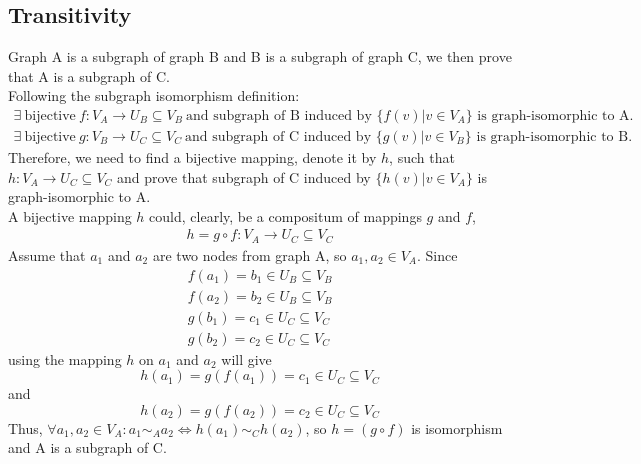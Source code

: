 \documentclass[a4paper,11pt]{article}
\begin{document}

\subsection{Transitivity}
Graph A is a subgraph of graph B and B is a subgraph of graph C, we then prove that A is a subgraph of C.
\\
Following the subgraph isomorphism definition:
\begin{align*}
    \exists \ \text{bijective} \ f : V_A \to U_B \subseteq V_B \ \text{and subgraph of B induced by } \{ f(v) | v \in V_A \} \text{ is graph-isomorphic to A.}
    \\
    \exists \ \text{bijective} \ g : V_B \to U_C \subseteq V_C \ \text{and subgraph of C induced by } \{ g(v) | v \in V_B \} \text{ is graph-isomorphic to B.}
\end{align*}
Therefore, we need to find a bijective mapping, denote it by $h$, such that $h: V_A \to U_C \subseteq V_C$ and prove that subgraph of C induced by $\{ h(v) | v \in V_A \}$ is graph-isomorphic to A.
\\
A bijective mapping $h$ could, clearly, be a compositum of mappings $g$ and $f$,
\begin{align*} 
    h = g \circ f : V_A \to U_C \subseteq V_C
\end{align*}
Assume that $a_1$ and $a_2$ are two nodes from graph A, so $a_1, a_2 \in V_A$.
Since
\begin{align*}
    f(a_1) = b_1 \in U_B \subseteq V_B
    \\
    f(a_2) = b_2 \in U_B \subseteq V_B
    \\
    g(b_1) = c_1 \in U_C \subseteq V_C 
    \\
    g(b_2) = c_2 \in U_C \subseteq V_C 
\end{align*}
using the mapping $h$ on $a_1$ and $a_2$ will give 
$$h(a_1) = g(f(a_1)) = c_1 \in U_C \subseteq V_C$$
and
$$h(a_2) = g(f(a_2)) = c_2 \in U_C \subseteq V_C$$
Thus, $ \forall a_1, a_2 \in V_A : a_1 \sim_A a_2 \Leftrightarrow  h(a_1) \sim_C h(a_2)$, so $h = (g \circ f)$ is isomorphism and A is a subgraph of C.


\end{document}
